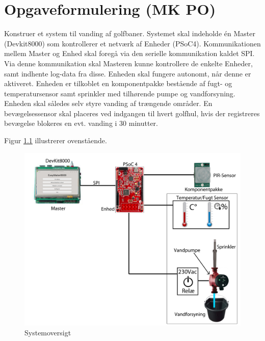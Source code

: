 \chapter{Opgaveformulering (MK PO)}

Konstruer et system til vanding af golfbaner. Systemet skal indeholde én Master (Devkit8000) som kontrollerer et netværk af Enheder (PSoC4). Kommunikationen mellem Master og Enhed skal foregå via den serielle kommunikation kaldet SPI. Via denne kommunikation skal Masteren kunne kontrollere de enkelte Enheder, samt indhente log-data fra disse. 
Enheden skal fungere autonomt, når denne er aktiveret. Enheden  er tilkoblet en komponentpakke bestående af fugt- og temperatursensor samt sprinkler med tilhørende pumpe og vandforsyning. Enheden skal således selv styre vanding af trængende områder. En bevægelsessensor skal placeres ved indgangen til hvert golfhul, hvis der registreres bevægelse blokeres en evt. vanding i 30 minutter.  

Figur \ref{fig:systemoversigt} illustrerer ovenstående.  

\begin{figure}[h]
  \centering
    \includegraphics[width=\textwidth]{Billeder/systemoversigt}
    \caption{Systemoversigt}
    \label{fig:systemoversigt}
\end{figure}
